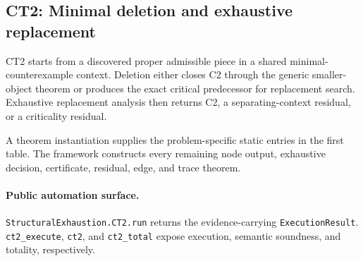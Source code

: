 \subsection{CT2: Minimal deletion and exhaustive replacement}
\label{sec:ct2-automation}

CT2 starts from a discovered proper admissible piece in a shared minimal-counterexample context. Deletion either closes C2 through the generic smaller-object theorem or produces the exact critical predecessor for replacement search. Exhaustive replacement analysis then returns C2, a separating-context residual, or a criticality residual.

A theorem instantiation supplies the problem-specific static entries in the first table. The framework constructs every remaining node output, exhaustive decision, certificate, residual, edge, and trace theorem.

\paragraph{Public automation surface.}
\texttt{StructuralExhaustion.CT2.run} returns the evidence-carrying \texttt{ExecutionResult}. \texttt{ct2\_\allowbreak{}execute}, \texttt{ct2}, and \texttt{ct2\_\allowbreak{}total} expose execution, semantic soundness, and totality, respectively.

